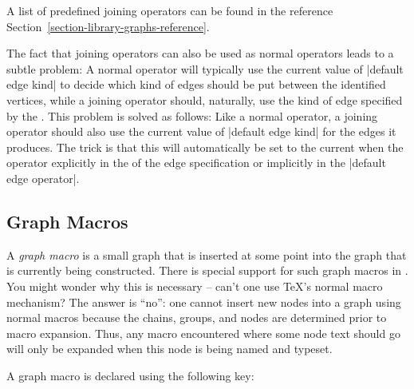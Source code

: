 A list of predefined joining operators can be found in the reference
Section~\ref{section-library-graphs-reference}.

The fact that joining operators can also be used as normal operators leads to a
subtle problem: A normal operator will typically use the current value of
|default edge kind| to decide which kind of edges should be put between the
identified vertices, while a joining operator should, naturally, use the kind
of edge specified by the . This problem is solved as
follows: Like a normal operator, a joining operator should also use the current
value of |default edge kind| for the edges it produces. The trick is that this
will automatically be set to the current  when the
operator explicitly in the  of the edge specification or
implicitly in the |default edge operator|.


\subsection{Graph Macros}
\label{section-library-graphs-macros}

A \emph{graph macro} is a small graph that is inserted at some point into the
graph that is currently being constructed. There is special support for such
graph macros in \tikzname. You might wonder why this is necessary -- can't one
use \TeX's normal macro mechanism? The answer is ``no'': one cannot insert new
nodes into a graph using normal macros because the chains, groups, and nodes
are determined prior to macro expansion. Thus, any macro encountered where some
node text should go will only be expanded when this node is being named and
typeset.

A graph macro is declared using the following key:

